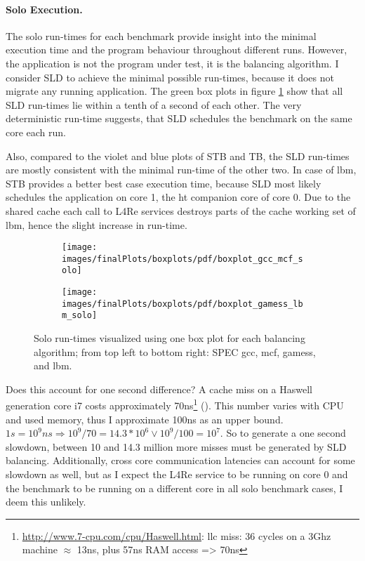 \paragraph{Solo Execution.}
The solo run-times for each benchmark provide insight into the minimal
execution time and the program behaviour throughout different runs.
However, the application is not the program under test, it is the balancing
algorithm.
I consider SLD to achieve the minimal possible run-times, because it does not
migrate any running application.
The green box plots in figure \ref{eval:fig:box_solo} show that all SLD run-times
lie within a tenth of a second of each other.
The very deterministic run-time suggests, that SLD schedules the benchmark on
the same core each run.

Also, compared to the violet and blue plots of STB and TB, the SLD run-times
are mostly consistent with the minimal run-time of the other two.
In case of lbm, STB provides a better best case execution time, because SLD
most likely schedules the application on core 1, the \gls{ht} companion core of
core 0.
Due to the shared cache each call to L4Re services destroys parts of the cache
working set of lbm, hence the slight increase in run-time.
%
\begin{figure}[!ht]
  \begin{subfigure}{\textwidth}
  \texttt{[image: images/finalPlots/boxplots/pdf/boxplot\_gcc\_mcf\_solo]}
  \end{subfigure}
  \begin{subfigure}{\textwidth}
  \texttt{[image: images/finalPlots/boxplots/pdf/boxplot\_gamess\_lbm\_solo]}
  \end{subfigure}
  \caption{Solo run-times visualized using one box plot for each balancing
    algorithm; from top left to bottom right: SPEC gcc, mcf, gamess, and lbm.}
    \label{eval:fig:box_solo}
\end{figure}
%
Does this account for one second difference?
A cache miss on a Haswell generation core i7 costs approximately
70ns\footnote{\url{http://www.7-cpu.com/cpu/Haswell.html}: \gls{llc} miss: 36
cycles on a 3Ghz machine $\approx$ 13ns, plus 57ns RAM access => 70ns}
(\cite{intel_perf_analysis_2009}).
This number varies with CPU and used memory, thus I approximate 100ns as an upper bound.
$1s  = 10^9ns \Rightarrow 10^9 / 70 = 14.3 * 10^6 \vee 10^9/100 = 10^7$.
So to generate a one second slowdown, between 10 and 14.3 million more misses must
be generated by SLD balancing.
Additionally, cross core communication latencies can account for some slowdown
as well, but as I expect the L4Re service to be running on core 0 and the
benchmark to be running on a different core in all solo benchmark cases, I deem
this unlikely.

